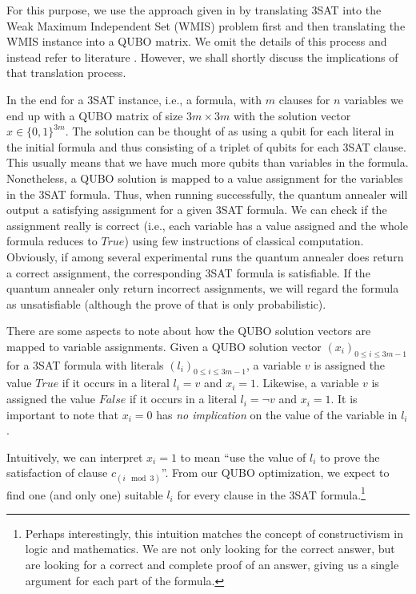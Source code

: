 For this purpose, we use the approach given in \cite{choi2010adiabatic,choi2011different} by translating 3SAT into the Weak Maximum Independent Set (WMIS) problem first and then translating the WMIS instance into a QUBO matrix. We omit the details of this process and instead refer to literature \cite{choi2010adiabatic,choi2011different,lucas2014ising}. However, we shall shortly discuss the implications of that translation process.

In the end for a 3SAT instance, i.e., a formula, with $m$ clauses for $n$ variables we end up with a QUBO matrix of size $3m \times 3m$ with the solution vector $x \in \{0,1\}^{3m}$. The solution can be thought of as using a qubit for each literal in the initial formula and thus consisting of a triplet of qubits for each 3SAT clause. This usually means that we have much more qubits than variables in the formula. Nonetheless, a QUBO solution is mapped to a value assignment for the variables in the 3SAT formula. Thus, when running successfully, the quantum annealer will output a satisfying assignment for a given 3SAT formula. We can check if the assignment really is correct (i.e., each variable has a value assigned and the whole formula reduces to $\textit{True}$) using few instructions of classical computation. Obviously, if among several experimental runs the quantum annealer does return a correct assignment, the corresponding 3SAT formula is satisfiable. If the quantum annealer only return incorrect assignments, we will regard the formula as unsatisfiable (although the prove of that is only probabilistic).

There are some aspects to note about how the QUBO solution vectors are mapped to variable assignments. Given a QUBO solution vector $(x_i)_{0 \leq i \leq 3m-1}$ for a 3SAT formula with literals $(l_i)_{0 \leq i \leq 3m-1}$, a variable $v$ is assigned the value $\textit{True}$ if it occurs in a literal $l_i = v$ and $x_i = 1$. Likewise, a variable $v$ is assigned the value $\textit{False}$ if it occurs in a literal $l_i = \lnot v$ and $x_i = 1$. It is important to note that $x_i = 0$ has \emph{no implication} on the value of the variable in $l_i$.

Intuitively, we can interpret $x_i = 1$ to mean ``use the value of $l_i$ to prove the satisfaction of clause $c_{(i \mod 3)}$''. From our QUBO optimization, we expect to find one (and only one) suitable $l_i$ for every clause in the 3SAT formula.\footnote{Perhaps interestingly, this intuition matches the concept of constructivism in logic and mathematics. We are not only looking for the correct answer, but are looking for a correct and complete proof of an answer, giving us a single argument for each part of the formula.}


